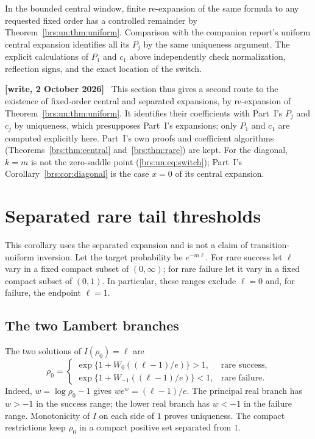 \documentclass[11pt]{article}
\numberwithin{equation}{section}
\theoremstyle{remark}\newtheorem{remark}[theorem]{Remark}
\newenvironment{writenote}{\par\smallskip\begingroup\small\noindent\textbf{[write, 2 October 2026]}\ }{\par\endgroup\smallskip}
\begin{document}
In the bounded central window, finite re-expansion of the same
formula to any requested fixed order has a controlled remainder by
Theorem~\ref{brs:un:thm:uniform}.  Comparison with the companion report's
uniform central expansion identifies all its $P_j$ by the same
uniqueness argument.  The explicit calculations of $P_1$ and $c_1$
above independently check normalization, reflection signs, and the
exact location of the switch.

\begin{writenote}
This section thus gives a second route to the existence of fixed-order central and separated expansions, by re-expansion of Theorem~\ref{brs:un:thm:uniform}. It identifies their coefficients with Part~I's $P_j$ and $c_j$ by uniqueness, which presupposes Part~I's expansions; only $P_1$ and $c_1$ are computed explicitly here. Part~I's own proofs and coefficient algorithms (Theorems~\ref{brs:thm:central} and~\ref{brs:thm:rare}) are kept. For the diagonal, $k=m$ is not the zero-saddle point (\eqref{brs:un:eq:switch}); Part~I's Corollary~\ref{brs:cor:diagonal} is the case $x=0$ of its central expansion.
\end{writenote}

\section{Separated rare tail thresholds}\label{brs:un:sec:inverse}

This corollary uses the separated expansion and is not a claim of
transition-uniform inversion.  Let the target probability be
$e^{-m\ell}$.  For rare success let $\ell$ vary in a fixed compact
subset of $(0,\infty)$; for rare failure let it vary in a fixed
compact subset of $(0,1)$.  In particular, these ranges exclude
$\ell=0$ and, for failure, the endpoint $\ell=1$.

\subsection{The two Lambert branches}

The two solutions of $I(\rho_0)=\ell$ are
\begin{equation}\label{brs:un:eq:lambert}
 \rho_0=
 \begin{cases}
  \exp\{1+W_0((\ell-1)/e)\}>1,&\text{rare success},\\
  \exp\{1+W_{-1}((\ell-1)/e)\}<1,&\text{rare failure}.
 \end{cases}
\end{equation}
Indeed, $w=\log\rho_0-1$ gives $we^w=(\ell-1)/e$.
The principal real branch has $w>-1$ in the success range; the lower
real branch has $w<-1$ in the failure range.  Monotonicity of $I$
on each side of $1$ proves uniqueness.  The compact restrictions
keep $\rho_0$ in a compact positive set separated from $1$.
\end{document}
